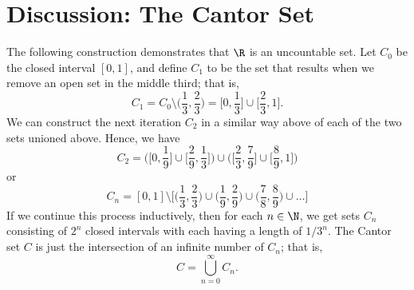 
\section{Discussion: The Cantor Set}

The following construction demonstrates that \( \R  \) is an uncountable set. Let \( C_0  \) be the closed interval \( [0,1] \), and define \( C_1 \) to be the set that results when we remove an open set in the middle third; that is, 
\[ C_1 = C_0 \setminus \Big( \frac{ 1 }{ 3 } , \frac{ 2 }{ 3 }  \Big) = \Big[ 0, \frac{ 1 }{ 3 } \Big] \cup \Big[\frac{ 2 }{ 3 } , 1 \Big]. \]
We can construct the next iteration \( C_2 \) in a similar way above of each of the two sets unioned above. Hence, we have 
\[ C_2 = \Big(  \Big[ 0, \frac{ 1  }{ 9 } \Big] \cup \Big[ \frac{ 2 }{ 9 } , \frac{ 1 }{ 3 } \Big]   \Big) \cup \Big( \Big[ \frac{ 2 }{ 3 } , \frac{ 7 }{ 9 } \Big] \cup \Big[ \frac{ 8 }{ 9 } , 1\Big]\Big)\]
or
\[ C_n = [0,1] \setminus \Big[ \Big(  \frac{ 1 }{ 3 } , \frac{ 2 }{ 3 } \Big) \cup \Big( \frac{ 1 }{ 9 } , \frac{ 2 }{ 9 }  \Big) \cup \Big( \frac{ 7 }{ 8 } , \frac{ 8 }{ 9 }  \Big) \cup \dots   \Big]  \]
If we continue this process inductively, then for each \(  n \in \N  \), we get sets \( C_n \) consisting of \( 2^n \) closed intervals with each having a length of \( 1/3^n \). The Cantor set \( C \) is just the intersection of an infinite number of \( C_n \); that is, 
\[ C = \bigcup_{ n=0 }^{ \infty  } C_n. \]

